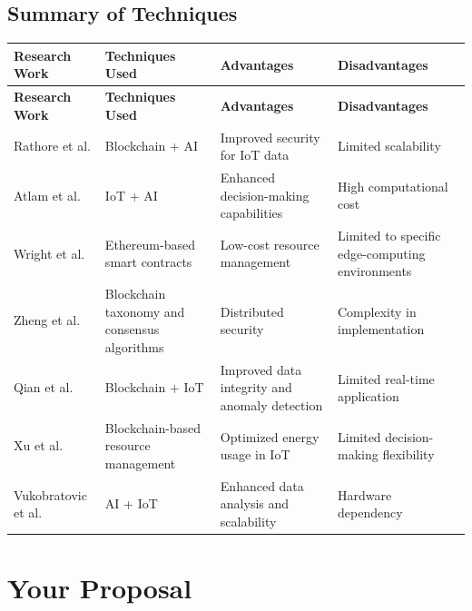 \documentclass[12pt, oneside]{report}
\begin{document}
\section{Summary of Techniques}

\begin{longtable}{|p{3.5cm}|p{3.5cm}|p{3.5cm}|p{3.5cm}|}
\hline
\textbf{Research Work} & \textbf{Techniques Used} & \textbf{Advantages} & \textbf{Disadvantages} \\
\hline
\endfirsthead

\hline
\textbf{Research Work} & \textbf{Techniques Used} & \textbf{Advantages} & \textbf{Disadvantages} \\
\hline
\endhead

\hline
\endfoot

Rathore et al. \cite{rathore2019} & Blockchain + AI & Improved security for IoT data & Limited scalability \\
\hline
Atlam et al. \cite{atlam2018} & IoT + AI & Enhanced decision-making capabilities & High computational cost \\
\hline
Wright et al. \cite{wright2018} & Ethereum-based smart contracts & Low-cost resource management & Limited to specific edge-computing environments \\
\hline
Zheng et al. \cite{zheng2018} & Blockchain taxonomy and consensus algorithms & Distributed security & Complexity in implementation \\
\hline
Qian et al. \cite{qian2018} & Blockchain + IoT & Improved data integrity and anomaly detection & Limited real-time application \\
\hline
Xu et al. \cite{xu2017} & Blockchain-based resource management & Optimized energy usage in IoT & Limited decision-making flexibility \\
\hline
Vukobratovic et al. \cite{vukobratovic2016} & AI + IoT & Enhanced data analysis and scalability & Hardware dependency \\
\hline

\end{longtable}


\chapter{Your Proposal}
\end{document}
